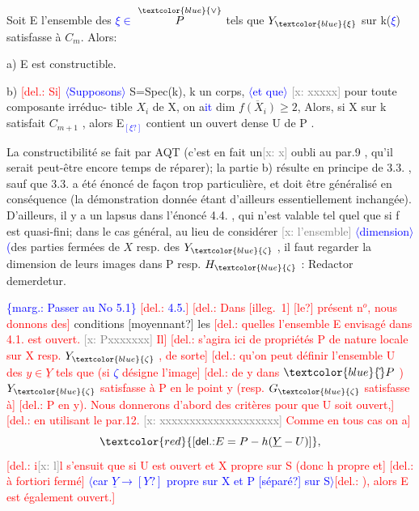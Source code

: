 \documentclass[11pt]{article}
\newcommand{\scanpage}[1]{\par\bigskip\noindent{\small\sffamily[scan #1]}\par}
\newcommand{\mspage}[1]{{\small\sffamily[p.\,#1]}}
\newcommand{\hand}[1]{\textcolor{blue}{#1}}
\newcommand{\inserted}[2][]{\textcolor{blue}{$\langle$#2$\rangle$}}
\newcommand{\margin}[1]{\textcolor{blue}{\{\textsf{marg.:} #1\}}}
\newcommand{\deleted}[1]{\textcolor{red}{[\textsf{del.:} #1]}}
\newcommand{\xout}[1]{\textcolor{gray}{[\textsf{x:} #1]}}
\newcommand{\unsure}[1]{[#1?]}
\newcommand{\illegible}[1]{[\textsf{illeg.\ #1}]}
\begin{document}
Soit E l'ensemble des \hand{$\xi \in$} $\overset{\hand{\vee}}{P}$  tels que  $Y_{\hand{\xi}}$ sur k(\hand{$\xi$}) satisfasse à $C_m$.
Alors:

a)  E est constructible.

b)  \deleted{Si} \inserted{Supposons} S=Spec(k), k un corps, \inserted{et que} \xout{xxxxx} pour toute composante irréduc-%
tible  $X_i$ de X, on a\hand{it} dim $\overline{f(X_i)} \geqslant 2$, Alors, si X sur k satisfait $C_{m+1}$ ,
alors E\hand{$_{\unsure{\xi}}$} contient un ouvert dense U de P .

\mspage{20}

\clearpage
\scanpage{25/21}
\mspage{18}

La constructibilité se fait par AQT (c'est en fait un\xout{x} oubli au
par.9 , qu'il serait peut-être encore temps de réparer); la partie b)
résulte en principe de 3.3. , sauf que 3.3. a été énoncé de façon trop
particulière, et doit être généralisé en conséquence (la démonstration
donnée étant d'ailleurs essentiellement inchangée). D'ailleurs, il y
a un lapsus dans l'énoncé 4.4. , qui n'est valable tel quel que si f
est quasi-fini; dans le cas général, au lieu de considérer \xout{l'ensemble} \inserted[typed]{dimension}
\hand{(}des parties fermées de $X$ resp. des $Y_{\hand{\zeta}}$ , il faut regarder la dimension
de leurs images dans P resp. $H_{\hand{\zeta}}$ : Redactor demerdetur.

\margin{Passer au No 5.1}
\deleted{\hand{4.5.}} \deleted{Dans \illegible{1} \unsure{le} présent n$^o$, nous donnons des} conditions \unsure{moyennant} les
\deleted{quelles l'ensemble E envisagé dans 4.1. est ouvert. \xout{Pxxxxxxx} Il}
\deleted{s'agira ici de propriétés P de nature locale sur X resp. $Y_{\hand{\zeta}}$ , de sorte}
\deleted{qu'on peut définir l'ensemble U des $y \in \underline{Y}$ tels que (si \hand{$\zeta$} désigne l'image}
\deleted{de y dans $\hand{\check{}}P$ ) $Y_{\hand{\zeta}}$ satisfasse à P en le point y (resp. $G_{\hand{\zeta}}$ satisfasse à}
\deleted{P en y). Nous donnerons d'abord des critères pour que U soit ouvert,}
\deleted{en utilisant le par.12. \xout{xxxxxxxxxxxxxxxxxxxx} Comme en tous cas on a}
\[ \deleted{E = P - h(\underline{Y} - U)} , \]
\deleted{i\xout{l}l s'ensuit que si U est ouvert et X propre sur S (donc h propre et}
\deleted{à fortiori fermé} \inserted{car $\underline{Y} \to \unsure{Y}$ propre sur X et P \unsure{séparé} sur S}\deleted{), alors E est également ouvert.}
\end{document}

